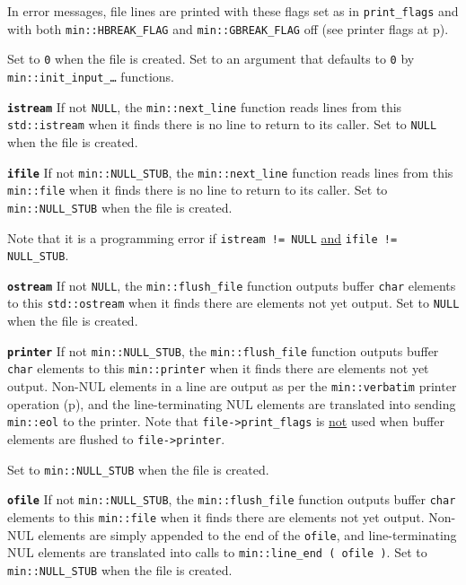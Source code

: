 \documentclass[12pt]{article}
\makeatletter
\newcommand{\ttmkey}[2]{{\tt \bf #1}\index{#1@{\tt #1}!#2}}
\newcommand{\pagref}[1]{p\pageref{#1}}
\newcommand{\EOL}{\penalty \exhyphenpenalty}
\newenvironment{itemlist}[1][1.2in]%
	{\begin{list}{}{\setlength{\labelwidth}{#1}%
		        \setlength{\leftmargin}{\labelwidth}%
		        \addtolength{\leftmargin}{+0.2in}%
		        \renewcommand{\makelabel}[1]{##1\hfill}}}%
	{\end{list}}
\makeatother
\begin{document}
\begin{itemlist}[1.4in]
In error messages, file lines are printed with these
flags set as in {\tt print\_\EOL flags} and with
both {\tt min::\EOL HBREAK\_\EOL FLAG} and {\tt min::\EOL GBREAK\_\EOL FLAG}
off (see printer flags at \pagref{PRINTER_FLAGS}).

Set to {\tt 0} when the file is created.  Set to an argument
that defaults to {\tt 0}
by {\tt min::\EOL init\_\EOL input\_\ldots} functions.

\item[\ttmkey{istream}{in {\tt min::file}}]
If not {\tt NULL}, the {\tt min::\EOL next\_\EOL line} function
reads lines from this {\tt std::\EOL istream} when it finds
there is no line to return to its caller.
Set to {\tt NULL} when the file is created.

\item[\ttmkey{ifile}{in {\tt min::file}}]
If not {\tt min::NULL\_STUB}, the {\tt min::\EOL next\_\EOL line} function
reads lines from this {\tt min::\EOL file} when it finds
there is no line to return to its caller.
Set to {\tt min::\EOL NULL\_\EOL STUB} when the file is created.

Note that it is a programming error if {\tt istream != NULL}
\underline{and} {\tt ifile != NULL\_\EOL STUB}.

\item[\ttmkey{ostream}{in {\tt min::file}}]
If not {\tt NULL}, the {\tt min::\EOL flush\_\EOL file} function
outputs buffer {\tt char} elements to this {\tt std::\EOL ostream} when it finds
there are elements not yet output.
Set to {\tt NULL} when the file is created.

\item[\ttmkey{printer}{in {\tt min::file}}]
If not {\tt min::NULL\_STUB}, the {\tt min::\EOL flush\_\EOL file} function
outputs buffer {\tt char} elements
to this {\tt min::\EOL printer} when it finds
there are elements not yet output.
Non-NUL elements in a
line are output as per the {\tt min::\EOL verbatim}
printer operation (\pagref{MIN::VERBATIM}),
and the line-terminating
NUL elements are translated into sending {\tt min::eol} to the printer.
Note that {\tt file->\EOL print\_\EOL flags} is \underline{not} used
when buffer elements are flushed to {\tt file->\EOL printer}.

Set to {\tt min::\EOL NULL\_\EOL STUB} when the file is created.

\item[\ttmkey{ofile}{in {\tt min::file}}]
If not {\tt min::NULL\_STUB}, the {\tt min::\EOL flush\_\EOL file} function
outputs buffer {\tt char} elements to this {\tt min::\EOL file} when it finds
there are elements not yet output.
Non-NUL elements are simply appended to the end of the {\tt ofile}, and
line-terminating NUL elements are translated into calls to
{\tt min::\EOL line\_\EOL end~(~ofile~)}.
Set to {\tt min::\EOL NULL\_\EOL STUB} when the file is created.


\end{itemlist}
\end{document}
